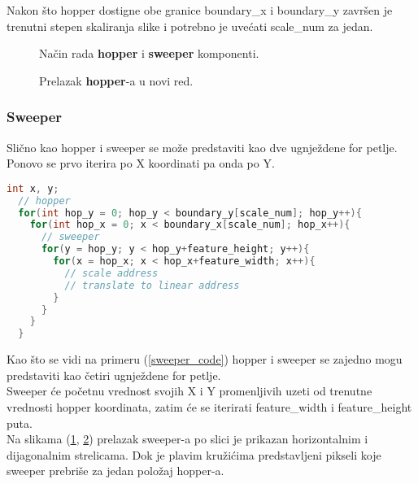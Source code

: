 Nakon što hopper dostigne obe granice boundary\_x i boundary\_y završen je
trenutni stepen skaliranja slike i potrebno je uvećati scale\_num za jedan.

\begin{figure}[H]
  \centering
  \scalebox{0.82}{
    
    
    }
\caption{Način rada \textbf{hopper} i \textbf{sweeper} komponenti.}
\label{hop_sweep1}
\end{figure}


\begin{figure}[H]
  \centering
  \scalebox{0.82}{
    
    
    }
\caption{Prelazak \textbf{hopper}-a u novi red.}
\label{hop_sweep2}
\end{figure}

\newpage

\subsubsection{Sweeper}\label{sweeper_sec}
Slično kao hopper i sweeper se može predstaviti kao dve ugnježdene for petlje. \\
Ponovo se prvo iterira po X koordinati pa onda po Y.

\begin{lstlisting}[language=C++,caption={Primer \textbf{sweeper}-a u \textbf{C}-u},captionpos=b, label=sweeper_code]
  int x, y;
  // hopper
  for(int hop_y = 0; hop_y < boundary_y[scale_num]; hop_y++){
    for(int hop_x = 0; x < boundary_x[scale_num]; hop_x++){
      // sweeper
      for(y = hop_y; y < hop_y+feature_height; y++){
        for(x = hop_x; x < hop_x+feature_width; x++){
          // scale address
          // translate to linear address
        }
      }
    }
  }
\end{lstlisting}

Kao što se vidi na primeru (\ref{sweeper_code}) hopper i sweeper se zajedno mogu
predstaviti kao četiri ugnježdene for petlje. \\
Sweeper će početnu vrednost svojih X i Y promenljivih uzeti od trenutne
vrednosti hopper koordinata, zatim će se iterirati feature\_width i
feature\_height puta. \\
Na slikama (\ref{hop_sweep1}, \ref{hop_sweep2}) prelazak sweeper-a po slici je
prikazan horizontalnim i dijagonalnim strelicama.
Dok je plavim kružićima predstavljeni pikseli koje sweeper prebriše za jedan
položaj hopper-a.

